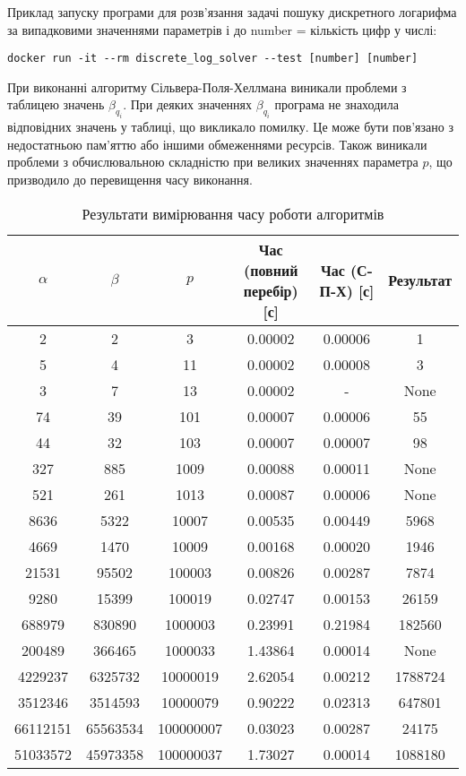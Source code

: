 \documentclass[12pt]{article}
\begin{document}
Приклад запуску програми для розв’язання задачі пошуку дискретного логарифма за випадковими значеннями параметрів і до number = кількість цифр у числі:

\begin{verbatim}
docker run -it --rm discrete_log_solver --test [number] [number]
\end{verbatim}

При виконанні алгоритму Сільвера-Поля-Хеллмана виникали проблеми з таблицею значень \( \beta_{q_i} \). При деяких значеннях \( \beta_{q_i} \) програма не знаходила відповідних значень у таблиці, що викликало помилку. Це може бути пов'язано з недостатньою пам'яттю або іншими обмеженнями ресурсів. Також виникали проблеми з обчислювальною складністю при великих значеннях параметра \( p \), що призводило до перевищення часу виконання.

\begin{table}[h]
\centering
\begin{tabular}{|c|c|c|c|c|c|}
\hline
\(\alpha\) & \(\beta\) & \(p\) & Час (повний перебір) [с] & Час (С-П-Х) [с] & Результат \\ \hline
2 & 2 & 3 & 0.00002 & 0.00006 & 1 \\ \hline
5 & 4 & 11 & 0.00002 & 0.00008 & 3 \\ \hline
3 & 7 & 13 & 0.00002 & - & None \\ \hline
74 & 39 & 101 & 0.00007 & 0.00006 & 55 \\ \hline
44 & 32 & 103 & 0.00007 & 0.00007 & 98 \\ \hline
327 & 885 & 1009 & 0.00088 & 0.00011 & None \\ \hline
521 & 261 & 1013 & 0.00087 & 0.00006 & None \\ \hline
8636 & 5322 & 10007 & 0.00535 & 0.00449 & 5968 \\ \hline
4669 & 1470 & 10009 & 0.00168 & 0.00020 & 1946 \\ \hline
21531 & 95502 & 100003 & 0.00826 & 0.00287 & 7874 \\ \hline
9280 & 15399 & 100019 & 0.02747 & 0.00153 & 26159 \\ \hline
688979 & 830890 & 1000003 & 0.23991 & 0.21984 & 182560 \\ \hline
200489 & 366465 & 1000033 & 1.43864 & 0.00014 & None \\ \hline
4229237 & 6325732 & 10000019 & 2.62054 & 0.00212 & 1788724 \\ \hline
3512346 & 3514593 & 10000079 & 0.90222 & 0.02313 & 647801 \\ \hline
66112151 & 65563534 & 100000007 & 0.03023 & 0.00287 & 24175 \\ \hline
51033572 & 45973358 & 100000037 & 1.73027 & 0.00014 & 1088180 \\ \hline
\end{tabular}
\caption{Результати вимірювання часу роботи алгоритмів}
\end{table}
\end{document}
